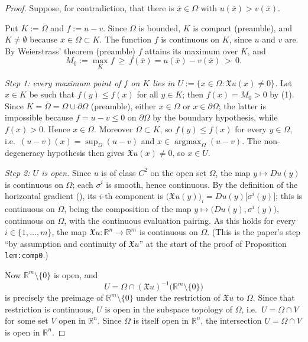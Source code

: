 \begin{proof}
Suppose, for contradiction, that there is $\bar x\in\Omega$ with $u(\bar x)>v(\bar x)$.

Put $K:=\overline\Omega$ and $f:=u-v$. Since $\Omega$ is bounded, $K$ is compact (preamble), and
$K\neq\emptyset$ because $\bar x\in\Omega\subset K$. The function $f$ is continuous on $K$, since
$u$ and $v$ are. By Weierstrass' theorem (preamble) $f$ attains its maximum over $K$, and
\begin{equation*}M_0:=\max_Kf\ \geq\ f(\bar x)=u(\bar x)-v(\bar x)\ >\ 0. \tag{1}\end{equation*}

\emph{Step 1: every maximum point of $f$ on $K$ lies in $U:=\{x\in\Omega:\mathfrak{X}u(x)\neq0\}$.}
Let $x\in K$ be such that $f(y)\leq f(x)$ for all $y\in K$; then $f(x)=M_0>0$ by (1). Since
$K=\overline\Omega=\Omega\cup\partial\Omega$ (preamble), either $x\in\Omega$ or
$x\in\partial\Omega$; the latter is impossible because $f=u-v\leq0$ on $\partial\Omega$ by the
boundary hypothesis, while $f(x)>0$. Hence $x\in\Omega$. Moreover $\Omega\subset K$, so
$f(y)\leq f(x)$ for every $y\in\Omega$, i.e.\ $(u-v)(x)=\sup_\Omega(u-v)$ and
$x\in\operatorname*{argmax}_\Omega(u-v)$. The non-degeneracy hypothesis then gives
$\mathfrak{X}u(x)\neq0$, so $x\in U$.

\emph{Step 2: $U$ is open.} Since $u$ is of class $C^2$ on the open set $\Omega$, the map
$y\mapsto Du(y)$ is continuous on $\Omega$; each $\sigma^i$ is smooth, hence continuous. By the
definition of the horizontal gradient (), its $i$-th component is
$\big(\mathfrak{X}u(y)\big)_i=Du(y)\big[\sigma^i(y)\big]$; this is continuous on $\Omega$, being
the composition of the map $y\mapsto\big(Du(y),\sigma^i(y)\big)$, continuous on $\Omega$, with the
continuous evaluation pairing. As this holds for every $i\in\{1,\dots,m\}$, the map
$\mathfrak{X}u:\mathbb{R}^n\to\mathbb{R}^m$ is continuous on $\Omega$. (This is the paper's step
``by assumption and continuity of $\mathfrak{X}u$'' at the start of the proof of Proposition
\texttt{lem:comp0}.)

Now $\mathbb{R}^m\setminus\{0\}$ is open, and
$$U=\Omega\cap(\mathfrak{X}u)^{-1}\big(\mathbb{R}^m\setminus\{0\}\big)$$
is precisely the preimage of $\mathbb{R}^m\setminus\{0\}$ under the restriction of
$\mathfrak{X}u$ to $\Omega$. Since that restriction is continuous, $U$ is open in the subspace
topology of $\Omega$, i.e.\ $U=\Omega\cap V$ for some set $V$ open in $\mathbb{R}^n$. Since
$\Omega$ is itself open in $\mathbb{R}^n$, the intersection $U=\Omega\cap V$ is open in
$\mathbb{R}^n$.


\end{proof}
